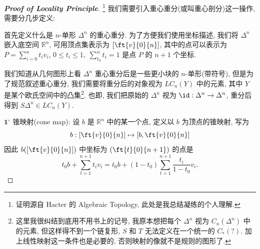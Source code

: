     \begin{proof}[{\bf Proof of Locality Principle}]\footnote{证明源自 Hacter 的 Algebraic Topology, 此处是我总结凝练的个人理解.}
        我们需要引入重心重分(或叫重心剖分)这一操作, 需要分几步定义:

         首先定义什么是 $n$-单形 $\Delta^n$ 的重心重分. 为了方便我们使用坐标描述, 
        我们将 $\Delta^n$ 嵌入底空间 $\mathbb{R}^n$, 可用顶点集表示为 $[\ft{v}{0}{n}]$, 
        其中的点可以表示为 $P = \sum_{i=0}^{n}t_iv_i$, $0\leq t_i\leq 1,\;\sum_{t_0}^{n}t_i=1$ 是点 $P$ 的 $n+1$ 个坐标.
        
        我们知道从几何图形上看 $\Delta^n$ 重心重分后是一些更小块的 $n$-单形(带符号),
        但是为了规范叙述重心重分, 我们需要将重分后的对象视为 $LC_n(Y)$ 中的元素, 其中 $Y$ 是某个欧氏空间中的凸集\footnote{这里我很纠结到底用不用书上的记号, 我原本想把每个 $\Delta^n$ 视为 $C_n(\Delta^n)$ 中的元素, 但这样得不到一个链复形, $S$ 和 $T$ 无法定义在一个统一的 $C_*(?)$. 加上线性映射这一条件也是必要的, 否则映射的像就不是规则的图形了.}. 
        也即, 我们把原始的 $\Delta^n$ 视为 $\id:\Delta^n\rightarrow\Delta^n$, 重分后得到 $S\Delta^n\in LC_n(Y)$.

        \noindent$\mathbf{1}^{\circ}$ 锥映射(cone map): 设 $b$ 是 $\mathbb{R}^{n}$ 中的某一个点, 定义以 $b$ 为顶点的锥映射, 写为
        \begin{equation*}
            b:[\ft{v}{0}{n}]\mapsto[b,\ft{v}{0}{n}]
        \end{equation*}
        因此 $b([\ft{v}{0}{n}])$ 中坐标为 $(\ft{t}{0}{n+1})$ 的点是 
        \begin{equation*}
            t_0b+\sum_{t=1}^{n+1}t_iv_i=t_0b+\left(1-t_0\right)\sum_{t=1}^{n+1}\dfrac{t_i}{1-t_0}v_i. 
        \end{equation*}


\end{proof}
